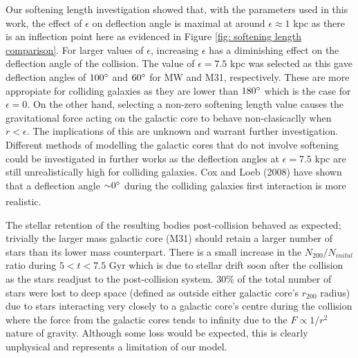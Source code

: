 \documentclass[10pt, twocolumn]{revtex4}    %
\begin{document}
Our softening length investigation showed that, with the parameters used in this work, the effect of $\epsilon$ on deflection angle is maximal at around $\epsilon \approx 1$ kpc as there is an inflection point here as evidenced in Figure \ref{fig: softening length comparison}. For larger values of $\epsilon$, increasing $\epsilon$ has a diminishing effect on the deflection angle of the collision. The value of $\epsilon=7.5$ kpc was selected as this gave deflection angles of $100\degree$ and $60\degree$ for MW and M31, respectively. These are more appropiate for colliding galaxies as they are lower than $180\degree$ which is the case for $\epsilon=0$. On the other hand, selecting a non-zero softening length value causes the gravitational force acting on the galactic core to behave non-clasicaclly when $r<\epsilon$. The implications of this are unknown and warrant further investigation. Different methods of modelling the galactic cores that do not involve softening could be investigated in further works as the deflection angles at $\epsilon = 7.5$ kpc are still unrealistically high for colliding galaxies. Cox and Loeb (2008) have shown that a deflection angle ${\sim}0\degree$ during the colliding galaxies first interaction is more realistic.\textsuperscript{\cite{CoxCollisionMilkyWay2008}}

The stellar retention of the resulting bodies post-collision behaved as expected; trivially the larger mass galactic core (M31) should retain a larger number of stars than its lower mass counterpart. There is a small increase in the $N_{200}/N_{inital}$ ratio during $5<t<7.5$ Gyr which is due to stellar drift soon after the collision as the stars readjust to the post-collision system. $30\%$ of the total number of stars were lost to deep space (defined as outside either galactic core's $r_{200}$ radius) due to stars interacting very closely to a galactic core's centre during the collision where the force from the galactic cores tends to infinity due to the $F\propto 1/r^2$ nature of gravity. Although some loss would be expected, this is clearly unphysical and represents a limitation of our model.
\end{document}
